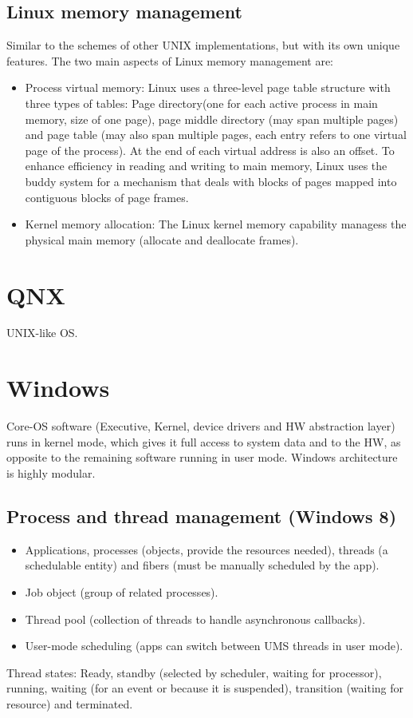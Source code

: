 \subsection{Linux memory management}
Similar to the schemes of other UNIX implementations, but with its own unique features. The two main aspects of Linux memory management are:
\begin{itemize}
    \item Process virtual memory: Linux uses a three-level page table structure with three types of tables: Page directory(one for each active process in main memory, size of one page), page middle directory (may span multiple pages) and page table (may also span multiple pages, each entry refers to one virtual page of the process). At the end of each virtual address is also an offset. To enhance efficiency in reading and writing to main memory, Linux uses the buddy system for a mechanism that deals with blocks of pages mapped into contiguous blocks of page frames.
    \item Kernel memory allocation: The Linux kernel memory capability managess the physical main memory (allocate and deallocate frames).
\end{itemize}

\section{QNX}
UNIX-like OS.

\section{Windows}
Core-OS software (Executive, Kernel, device drivers and HW abstraction layer) runs in kernel mode, which gives it full access to system data and to the HW, as opposite to the remaining software running in user mode. Windows architecture is highly modular.

\subsection{Process and thread management (Windows 8)}
\begin{itemize}
    \item Applications, processes (objects, provide the resources needed), threads (a schedulable entity) and fibers (must be manually scheduled by the app).
    \item Job object (group of related processes).
    \item Thread pool (collection of threads to handle asynchronous callbacks).
    \item User-mode scheduling (apps can switch between UMS threads in user mode).
\end{itemize}
Thread states:
Ready, standby (selected by scheduler, waiting for processor), running, waiting (for an event or because it is suspended), transition (waiting for resource) and terminated.

